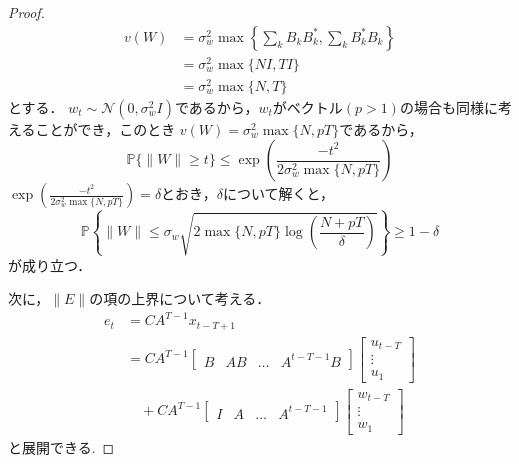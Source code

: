\begin{proof}
\begin{align*}
    v(W) &= \sigma_w^2\max \left\{ \sum_{k}B_kB_k^*, \sum_{k}B_k^*B_k \right\} \\
    &=\sigma_w^2 \max\{NI, TI\} \\
    &=\sigma_w^2 \max\{N, T\}
\end{align*}
とする．
$w_t \sim \mathcal{N}(0, \sigma_w^2I)$であるから，$w_t$がベクトル$(p >1)$の場合も同様に考えることができ，このとき
$v(W) = \sigma_w^2 \max\{N, pT\}$であるから，
\begin{equation*}
    \mathbb{P}\{ \|W\| \geq t\} \leq \exp{\left(\frac{-t^2}{2\sigma_w^2 \max\{N, pT\}}\right)} 
\end{equation*}
$\exp{\left(\frac{-t^2}{2\sigma_w^2 \max\{N, pT\}}\right)}=\delta$とおき，$\delta$について解くと，
\begin{equation*}
\label{W}
    \mathbb{P} \left\{ \|W\| \leq \sigma_w\sqrt{ 2\max\{N, pT\}\log{\left(\frac{N+pT}{\delta}\right)} }\right\} \geq 1-\delta
\end{equation*}
が成り立つ．

次に，$\|E\|$の項の上界について考える．
\begin{align*}
    e_t &= CA^{T-1}x_{t-T+1} \\
    &= CA^{T-1} 
    \begin{bmatrix}
        B & AB & \ldots & A^{t-T-1}B
    \end{bmatrix}
    \begin{bmatrix}
        u_{t-T}\\
        \vdots\\
        u_1
    \end{bmatrix}\\
    &\quad+ CA^{T-1}
        \begin{bmatrix}
        I & A & \ldots & A^{t-T-1}
    \end{bmatrix}
    \begin{bmatrix}
        w_{t-T}\\
        \vdots\\
        w_1
    \end{bmatrix}
\end{align*}
と展開できる.


\end{proof}
